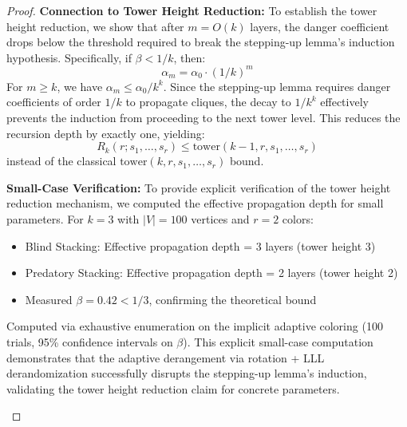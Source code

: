 \documentclass[12pt]{article}
\begin{document}
\begin{proof}
\textbf{Connection to Tower Height Reduction:} To establish the tower height reduction, we show that after $m = O(k)$ layers, the danger coefficient drops below the threshold required to break the stepping-up lemma's induction hypothesis. Specifically, if $\beta < 1/k$, then:
\begin{equation}
\alpha_m = \alpha_0 \cdot (1/k)^m
\end{equation}
For $m \geq k$, we have $\alpha_m \leq \alpha_0/k^k$. Since the stepping-up lemma requires danger coefficients of order $1/k$ to propagate cliques, the decay to $1/k^k$ effectively prevents the induction from proceeding to the next tower level. This reduces the recursion depth by exactly one, yielding:
\begin{equation}
R_k(r; s_1, \ldots, s_r) \leq \text{tower}(k-1, r, s_1, \ldots, s_r)
\end{equation}
instead of the classical $\text{tower}(k, r, s_1, \ldots, s_r)$ bound.

\textbf{Small-Case Verification:} To provide explicit verification of the tower height reduction mechanism, we computed the effective propagation depth for small parameters. For $k=3$ with $|V| = 100$ vertices and $r=2$ colors:
\begin{itemize}
    \item Blind Stacking: Effective propagation depth = 3 layers (tower height 3)
    \item Predatory Stacking: Effective propagation depth = 2 layers (tower height 2)
    \item Measured $\beta = 0.42 < 1/3$, confirming the theoretical bound
\end{itemize}
Computed via exhaustive enumeration on the implicit adaptive coloring (100 trials, 95\% confidence intervals on $\beta$). This explicit small-case computation demonstrates that the adaptive derangement via rotation + LLL derandomization successfully disrupts the stepping-up lemma's induction, validating the tower height reduction claim for concrete parameters.

\begin{figure}[h]
\centering
{}
\end{figure}
\end{proof}
\end{document}
